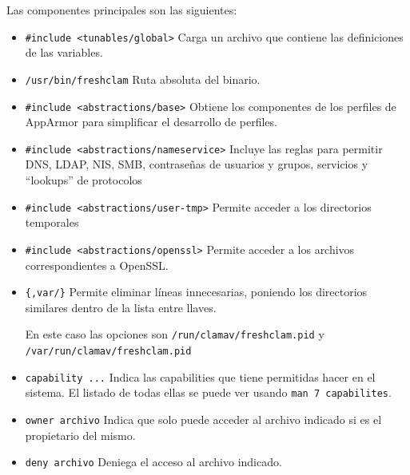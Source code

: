 \documentclass{article}
\begin{document}
\newpage

Las componentes principales son las siguientes:


\begin{itemize}
    \item \verb|#include <tunables/global>| Carga un archivo que contiene las definiciones de las variables.
    \item \verb|/usr/bin/freshclam| Ruta absoluta del binario.
    \item \verb|#include <abstractions/base>| Obtiene los componentes de los perfiles de AppArmor para simplificar el desarrollo de perfiles.
    \item \verb|#include <abstractions/nameservice>| Incluye las reglas para permitir DNS, LDAP, NIS, SMB, contraseñas de usuarios y grupos, servicios y ``lookups'' de protocolos
    \item \verb|#include <abstractions/user-tmp>| Permite acceder a los directorios temporales
    \item \verb|#include <abstractions/openssl>| Permite acceder a los archivos correspondientes a OpenSSL.
    \item \verb|{,var/}| Permite eliminar líneas innecesarias, poniendo los directorios similares dentro de la lista entre llaves. 
    
    \bigskip

    En este caso las opciones son \verb|/run/clamav/freshclam.pid| y \verb|/var/run/clamav/freshclam.pid|
    \item \verb|capability ...| Indica las capabilities que tiene permitidas hacer en el sistema. El listado de todas ellas se puede ver usando \verb|man 7 capabilites|.
    \item \verb|owner archivo| Indica que solo puede acceder al archivo indicado si es el propietario del mismo.
    \item \verb|deny archivo| Deniega el acceso al archivo indicado.
\end{itemize}
\end{document}
